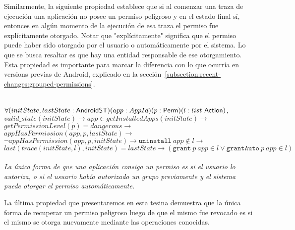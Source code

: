 Similarmente, la siguiente propiedad establece que si al comenzar una traza de ejecución una
aplicación no posee un permiso peligroso y en el estado final sí, entonces en algún momento de la
ejecución de esa traza el permiso fue explícitamente otorgado. Notar que "explícitamente" significa
que el permiso puede haber sido otorgado por el usuario o automáticamente por el sistema. Lo que se
busca resaltar es que hay una entidad responsable de ese otorgamiento. Esta propiedad es importante
para marcar la diferencia con lo que ocurría en versions previas de Android, explicado en la
sección~\ref{subsection:recent-changes:grouped-permissions}.

\begin{prop}
    \label{impproperty2}
    \mbox{} \\
    $	\forall
        (initState,lastState:\mathsf{AndroidST})
        (app:AppId)
        (p:\mathsf{Perm})
        (l: list\ \mathsf{Action})$, \\
    $	valid\_state(initState) \rightarrow
        app \in getInstalledApps(initState) \rightarrow$ \\
    $	getPermissionLevel(p)= dangerous \rightarrow $\\
    $	appHasPermission(app,p,lastState) \rightarrow$\\
    $	\neg appHasPermission(app,p,initState)\rightarrow
        \texttt{uninstall}~app \notin l \rightarrow $ \\
    $	last(trace(initState,l),initState) = lastState \rightarrow
        (\texttt{grant}~p~app \in l \lor \texttt{grantAuto}~p~app \in l)$ \\ \\
    \textit{La única forma de que una aplicación consiga un permiso es si el usuario lo autoriza, o
        si el usuario había autorizado un grupo previamente y el sistema puede otorgar el permiso
        automáticamente.}
\end{prop}

La última propiedad que presentaremos en esta tesina demuestra que la única forma de recuperar un
permiso peligroso luego de que el mismo fue revocado es si el mismo se otorga nuevamente mediante
las operaciones conocidas.

